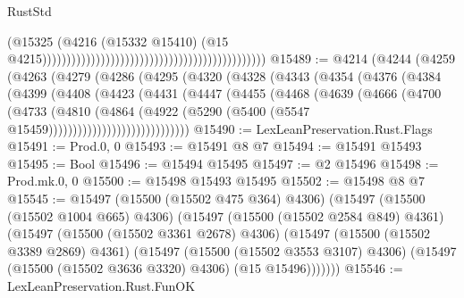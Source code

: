 \begin{lexlean}{RustStd}
\begin{coremodule}
{\begin{coremodule}
{{{{{{{{{{{{{{{{{{{{{{{{{{{{{{{{{{{{{{{{{{{{{{{{{{{{{{{{{{{{                                                                                          (@15325
                                                                                            (@4216
                                                                                              (@15332
                                                                                                @15410)
                                                                                              (@15
                                                                                                @4215))))))))))))))))))))))))))))))))))))))))))))))
@15489 := @4214
    (@4244
      (@4259
        (@4263
          (@4279
            (@4286
              (@4295
                (@4320
                  (@4328
                    (@4343
                      (@4354
                        (@4376
                          (@4384
                            (@4399
                              (@4408
                                (@4423
                                  (@4431
                                    (@4447
                                      (@4455
                                        (@4468
                                          (@4639
                                            (@4666
                                              (@4700
                                                (@4733
                                                  (@4810
                                                    (@4864
                                                      (@4922
                                                        (@5290
                                                          (@5400
                                                            (@5547
                                                              @15459)))))))))))))))))))))))))))))
@15490 := LexLeanPreservation.Rust.Flags
@15491 := Prod.{0, 0}
@15493 := @15491 @8 @7
@15494 := @15491 @15493
@15495 := Bool
@15496 := @15494 @15495
@15497 := @2 @15496
@15498 := Prod.mk.{0, 0}
@15500 := @15498 @15493 @15495
@15502 := @15498 @8 @7
@15545 := @15497
    (@15500 (@15502 @475 @364) @4306)
    (@15497
      (@15500 (@15502 @1004 @665) @4306)
      (@15497
        (@15500 (@15502 @2584 @849) @4361)
        (@15497
          (@15500 (@15502 @3361 @2678) @4306)
          (@15497
            (@15500 (@15502 @3389 @2869) @4361)
            (@15497
              (@15500 (@15502 @3553 @3107) @4306)
              (@15497 (@15500 (@15502 @3636 @3320) @4306) (@15 @15496)))))))
@15546 := LexLeanPreservation.Rust.FunOK
}}}}}}}}}}}}}}}}}}}}}}}}}}}}}}}}}}}}}}}}}}}}}}}}}}}}}}}}}}}}
\end{coremodule}}
\end{coremodule}
\end{lexlean}
